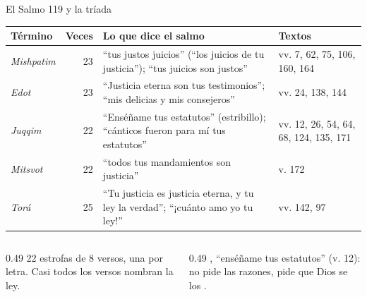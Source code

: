 \begin{frame}{El Salmo 119 y la tríada}
\scriptsize\renewcommand{\arraystretch}{1.2}
\begin{tabular}{@{}>{\RaggedRight\arraybackslash}p{1.7cm}r>{\RaggedRight\arraybackslash}p{6.0cm}>{\RaggedRight\arraybackslash}p{3.0cm}@{}}
\toprule
\textbf{Término} & \textbf{Veces} & \textbf{Lo que dice el salmo} & \textbf{Textos} \\ \midrule
\emph{Mishpatim} & 23 & ``tus justos juicios'' (``los juicios de tu justicia''); ``tus juicios son justos'' & vv. 7, 62, 75, 106, 160, 164 \\
\emph{Edot} & 23 & ``Justicia eterna son tus testimonios''; ``mis delicias y mis consejeros'' & vv. 24, 138, 144 \\
\emph{Juqqim} & 22 & ``Enséñame tus estatutos'' (estribillo); ``cánticos fueron para mí tus estatutos'' & vv. 12, 26, 54, 64, 68, 124, 135, 171 \\
\emph{Mitsvot} & 22 & ``todos tus mandamientos son justicia'' & v. 172 \\
\emph{Torá} & 25 & ``Tu justicia es justicia eterna, y tu ley la verdad''; ``¡cuánto amo yo tu ley!'' & vv. 142, 97 \\
\bottomrule
\end{tabular}\par\medskip
\begin{columns}[t,onlytextwidth]
\begin{column}{0.49\textwidth}\small
22 estrofas de 8 versos, una por letra. Casi todos los versos nombran la ley.
\end{column}
\begin{column}{0.49\textwidth}\small
{}, ``enséñame tus estatutos'' (v. 12): no pide las razones, pide que Dios se los .
\end{column}
\end{columns}
\end{frame}


